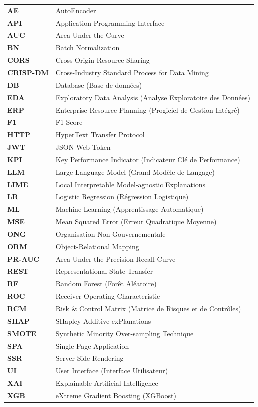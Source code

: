 \documentclass[12pt,a4paper,twoside]{report}
\begin{document}
\begin{tabular}{ll}
  \textbf{AE}      & AutoEncoder \\
  \textbf{API}     & Application Programming Interface \\
  \textbf{AUC}     & Area Under the Curve \\
  \textbf{BN}      & Batch Normalization \\
  \textbf{CORS}    & Cross-Origin Resource Sharing \\
  \textbf{CRISP-DM} & Cross-Industry Standard Process for Data Mining \\
  \textbf{DB}      & Database (Base de données) \\
  \textbf{EDA}     & Exploratory Data Analysis (Analyse Exploratoire des Données) \\
  \textbf{ERP}     & Enterprise Resource Planning (Progiciel de Gestion Intégré) \\
  \textbf{F1}      & F1-Score \\
  \textbf{HTTP}    & HyperText Transfer Protocol \\
  \textbf{JWT}     & JSON Web Token \\
  \textbf{KPI}     & Key Performance Indicator (Indicateur Clé de Performance) \\
  \textbf{LLM}     & Large Language Model (Grand Modèle de Langage) \\
  \textbf{LIME}    & Local Interpretable Model-agnostic Explanations \\
  \textbf{LR}      & Logistic Regression (Régression Logistique) \\
  \textbf{ML}      & Machine Learning (Apprentissage Automatique) \\
  \textbf{MSE}     & Mean Squared Error (Erreur Quadratique Moyenne) \\
  \textbf{ONG}     & Organisation Non Gouvernementale \\
  \textbf{ORM}     & Object-Relational Mapping \\
  \textbf{PR-AUC}  & Area Under the Precision-Recall Curve \\
  \textbf{REST}    & Representational State Transfer \\
  \textbf{RF}      & Random Forest (Forêt Aléatoire) \\
  \textbf{ROC}     & Receiver Operating Characteristic \\
  \textbf{RCM}     & Risk \& Control Matrix (Matrice de Risques et de Contrôles) \\
  \textbf{SHAP}    & SHapley Additive exPlanations \\
  \textbf{SMOTE}   & Synthetic Minority Over-sampling Technique \\
  \textbf{SPA}     & Single Page Application \\
  \textbf{SSR}     & Server-Side Rendering \\
  \textbf{UI}      & User Interface (Interface Utilisateur) \\
  \textbf{XAI}     & Explainable Artificial Intelligence \\
  \textbf{XGB}     & eXtreme Gradient Boosting (XGBoost) \\
\end{tabular}
\end{document}
